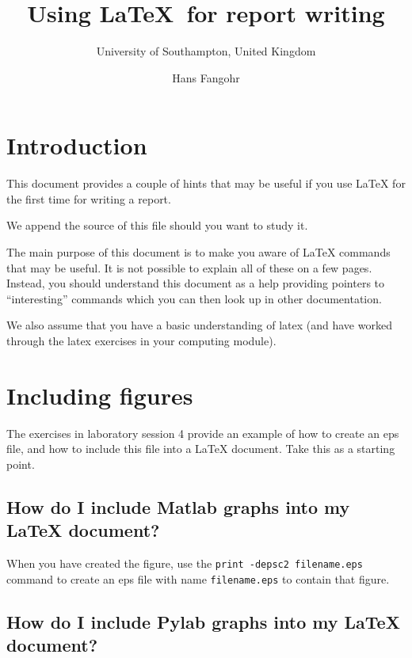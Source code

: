 \documentclass[12pt,a4paper]{article}
\begin{document}
\title{\sffamily \huge \textbf{ Using  \LaTeX\ for report writing}}

\date{Hans Fangohr}

\author{University of Southampton, United Kingdom}

\maketitle



\tableofcontents

\newpage

\section{Introduction}

This document provides a couple of hints that may be useful if you use
\LaTeX{} for the first time for writing a report. 

We append the source of this file should you want to study it.

The main purpose of this document is to make you aware of \LaTeX{}
commands that may be useful. It is not possible to explain all of
these on a few pages. Instead, you should understand this document as
a help providing pointers to ``interesting'' commands which you can
then look up in other documentation.

We also assume that you have a basic understanding of latex (and have
worked through the latex exercises in your computing module).

\section{Including figures}

The exercises in laboratory session 4 provide an example of how to
create an eps file, and how to include this file into a \LaTeX{}
document. Take this as a starting point.

\subsection{How do I include Matlab graphs into my LaTeX document?}

When you have created the figure, use the \texttt{print -depsc2
  filename.eps} command to create an eps file with name
\texttt{filename.eps} to contain that figure.

\subsection{How do I include Pylab graphs into my LaTeX document?}
\end{document}
